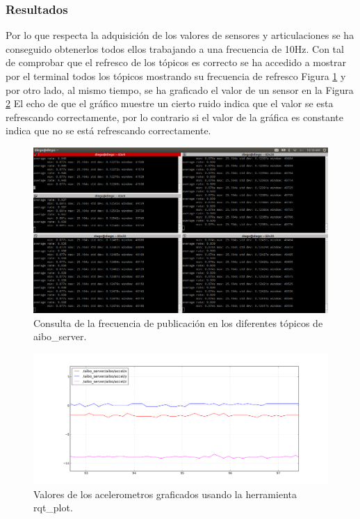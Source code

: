 \documentclass[12pt,a4paper,final,twoside]{book}
\begin{document}
\subsubsection{Resultados}

Por lo que respecta la adquisición de los valores de sensores y articulaciones se ha conseguido obtenerlos todos ellos trabajando a una frecuencia de 10Hz. Con tal de comprobar que el refresco de los tópicos es correcto se ha accedido a mostrar por el terminal todos los tópicos mostrando su frecuencia de refresco Figura \ref{fig:getT} y por otro lado, al mismo tiempo, se ha graficado el valor de un sensor en la Figura \ref{fig:addacc} El echo de que el gráfico muestre un cierto ruido indica que el valor se esta refrescando correctamente, por lo contrario si el valor de la gráfica es constante indica que no se está refrescando correctamente.

\begin{figure}[H]
	\centering
    \includegraphics[scale=0.3]{images/getTopics.png}
	 \caption{Consulta de la frecuencia de publicación en los diferentes tópicos de aibo{\_}server.}
  \label{fig:getT}
\end{figure}

\begin{figure}[H]
	\centering
    \includegraphics[scale=0.4]{images/addaccel.png}
	 \caption{Valores de los acelerometros graficados usando la herramienta rqt{\_}plot.}
  \label{fig:addacc}
\end{figure}
\end{document}
